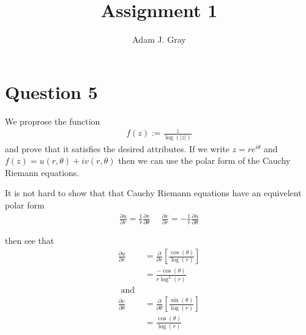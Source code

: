 \documentclass{unswmaths}
\begin{document}
\author{Adam J. Gray}
\title{Assignment 1}
\subject{Complex Analysis}

\newcommand{\llra}{\Leftrightarrow}

\unswtitle

\section*{Question 5}
We proprose the function
\begin{align*}
    f(z) := \frac{z}{\log(|z|)}
\end{align*}
and prove that it satisfies the desired attributes.
If we write $ z = re^{i\theta} $ and $ f(z) = u(r, \theta) + iv(r, \theta) $ then we can use the polar form of the Cauchy Riemann equations.

It is not hard to show that that Cauchy Riemann equations have an equivelent polar form
\begin{align*}
    \frac{\partial u}{\partial r} = \frac{1}{r} \frac{\partial v}{\partial \theta} \ \ \ \ \ \  \frac{\partial v}{\partial r} = - \frac{1}{r} \frac{\partial u}{\partial \theta}
\end{align*}

then see that
\begin{align*}
    \frac{\partial u}{\partial r} &= \frac{\partial}{\partial r} \left[ \frac{\cos(\theta)}{\log(r)}\right] \\
        &= \frac{-\cos(\theta)}{r \log^2(r)} \\
    \text{ and } \\
    \frac{\partial v}{\partial \theta} &= \frac{\partial}{\partial \theta} \left[ \frac{\sin(\theta)}{\log(r)}\right] \\
        &= \frac{\cos(\theta)}{\log(r)} 
\end{align*}
\end{document}

